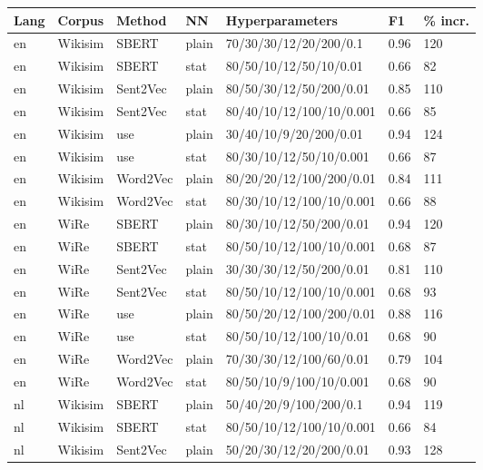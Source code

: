 \begin{table}[!ht]
	\centering
	\captionsetup{justification=centering}
    \begin{tabular}{l|l|l|l|l|l|l}
    \hline
        \textbf{Lang} & \textbf{Corpus} & \textbf{Method} & \textbf{NN} & \textbf{Hyperparameters} & \textbf{F1} & \textbf{\% incr.} \\ \hline
en & Wikisim & SBERT & plain & 70/30/30/12/20/200/0.1 & 0.96 & 120 \\ \hline
en & Wikisim & SBERT & stat & 80/50/10/12/50/10/0.01 & 0.66 & 82 \\ \hline
en & Wikisim & Sent2Vec & plain & 80/50/30/12/50/200/0.01 & 0.85 & 110 \\ \hline
en & Wikisim & Sent2Vec & stat & 80/40/10/12/100/10/0.001 & 0.66 & 85 \\ \hline
en & Wikisim & use & plain & 30/40/10/9/20/200/0.01 & 0.94 & 124 \\ \hline
en & Wikisim & use & stat & 80/30/10/12/50/10/0.001 & 0.66 & 87 \\ \hline
en & Wikisim & Word2Vec & plain & 80/20/20/12/100/200/0.01 & 0.84 & 111 \\ \hline
en & Wikisim & Word2Vec & stat & 80/30/10/12/100/10/0.001 & 0.66 & 88 \\ \hline
en & WiRe & SBERT & plain & 80/30/10/12/50/200/0.01 & 0.94 & 120 \\ \hline
en & WiRe & SBERT & stat & 80/50/10/12/100/10/0.001 & 0.68 & 87 \\ \hline
en & WiRe & Sent2Vec & plain & 30/30/30/12/50/200/0.01 & 0.81 & 110 \\ \hline
en & WiRe & Sent2Vec & stat & 80/50/10/12/100/10/0.001 & 0.68 & 93 \\ \hline
en & WiRe & use & plain & 80/50/20/12/100/200/0.01 & 0.88 & 116 \\ \hline
en & WiRe & use & stat & 80/50/10/12/100/10/0.01 & 0.68 & 90 \\ \hline
en & WiRe & Word2Vec & plain & 70/30/30/12/100/60/0.01 & 0.79 & 104 \\ \hline
en & WiRe & Word2Vec & stat & 80/50/10/9/100/10/0.001 & 0.68 & 90 \\ \hline
nl & Wikisim & SBERT & plain & 50/40/20/9/100/200/0.1 & 0.94 & 119 \\ \hline
nl & Wikisim & SBERT & stat & 80/50/10/12/100/10/0.001 & 0.66 & 84 \\ \hline
nl & Wikisim & Sent2Vec & plain & 50/20/30/12/20/200/0.01 & 0.93 & 128 \\ \hline

\end{tabular}
\end{table}
